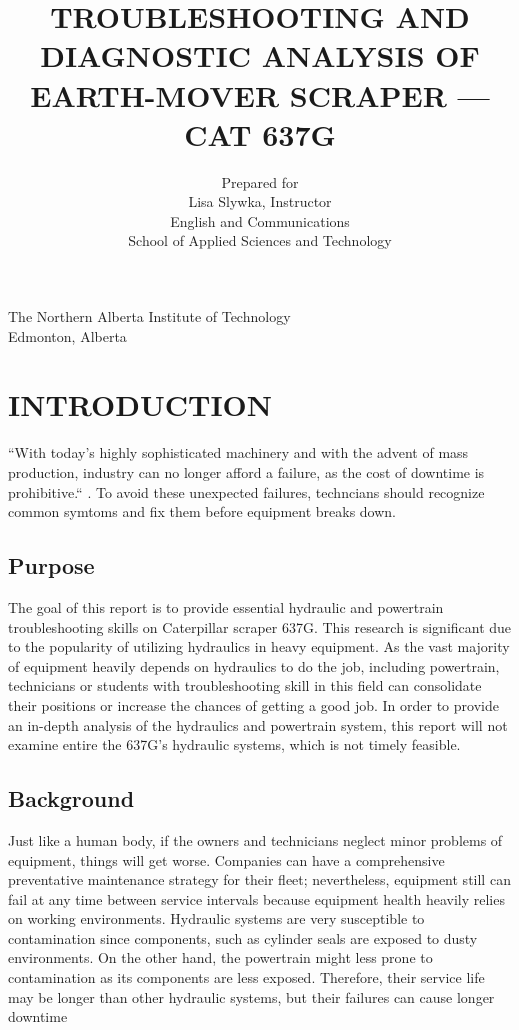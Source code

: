 \documentclass[a4paper,man,natbib]{apa6}
\title{\textbf{TROUBLESHOOTING AND DIAGNOSTIC ANALYSIS OF EARTH-MOVER SCRAPER --- CAT 637G}}
\author{Prepared for

Lisa Slywka, Instructor

English and Communications

School of Applied Sciences and Technology
}
\affiliation{Prepared by

Tai Tran, 200222333

Industrial Heavy Equipment Technician Program

School of Applied Trades

October 31, 2016
}
\begin{document}
\centering The Northern Alberta Institute of Technology\\ Edmonton, Alberta

\maketitle

\tableofcontents
\newpage

\listoffigures
\newpage

\listoftables
\newpage



\section{INTRODUCTION}

``With today's highly sophisticated machinery and with the advent of mass production, industry can no longer afford a failure, as the cost of downtime is prohibitive.`` \citep[p. 190]{DodPracHyd}. To avoid these unexpected failures, techncians should recognize common symtoms and fix them before equipment breaks down.

\subsection{Purpose}

The goal of this report is to provide essential hydraulic and powertrain troubleshooting skills on Caterpillar scraper 637G. This research is significant due to the popularity of utilizing hydraulics in heavy equipment. As the vast majority of equipment heavily depends on hydraulics to do the job, including powertrain, technicians or students with troubleshooting skill in this field can consolidate their positions or increase the chances of getting a good job. In order to provide an in-depth analysis of the hydraulics and powertrain system, this report will not examine entire the 637G's hydraulic systems, which is not timely feasible.

\subsection{Background}

Just like a human body, if the owners and technicians neglect minor problems of equipment, things will get worse. Companies can have a comprehensive preventative maintenance strategy for their fleet; nevertheless, equipment still can fail at any time between service intervals because equipment health heavily relies on working environments. Hydraulic systems are very susceptible to contamination since components, such as cylinder seals are exposed to dusty environments. On the other hand, the powertrain might less prone to contamination as its components are less exposed. Therefore, their service life may be longer than other hydraulic systems, but their failures can cause longer downtime
\end{document}
